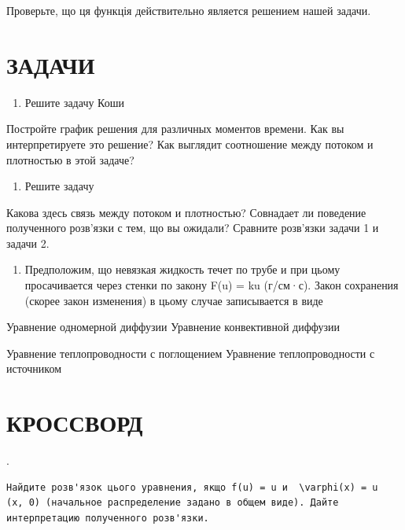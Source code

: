 \documentclass[
  ukrainian,
]{article}
\providecommand{\tightlist}{%
  \setlength{\itemsep}{0pt}\setlength{\parskip}{0pt}}
\begin{document}
Проверьте, що ця функція действительно является решением нашей задачи.

\section{\texorpdfstring{\textbf{ЗАДАЧИ}}{ЗАДАЧИ}}\label{ux437ux430ux434ux430ux447ux438-8}

\begin{enumerate}
\def\labelenumi{\arabic{enumi}.}
\tightlist
\item
  Решите задачу Коши
\end{enumerate}

Постройте график решения для различных моментов времени. Как вы
интерпретируете это решение? Как выглядит соотношение между потоком и
плотностью в этой задаче?

\begin{enumerate}
\def\labelenumi{\arabic{enumi}.}
\setcounter{enumi}{1}
\tightlist
\item
  Решите задачу
\end{enumerate}

Какова здесь связь между потоком и плотностью? Совнадает ли поведение
полученного розв'язки с тем, що вы ожидали? Сравните розв'язки задачи 1
и задачи 2.

\begin{enumerate}
\def\labelenumi{\arabic{enumi}.}
\setcounter{enumi}{2}
\tightlist
\item
  Предположим, що невязкая жидкость течет по трубе и при цьому
  просачивается через стенки по закону F(u) = ku (г/см·с). Закон
  сохранения (скорее закон изменения) в цьому случае записывается в виде
\end{enumerate}

Уравнение одномерной диффузии Уравнение конвективной диффузии

Уравнение теплопроводности с поглощением Уравнение теплопроводности с
источником

\section{\texorpdfstring{\textbf{КРОССВОРД}}{КРОССВОРД}}\label{ux43aux440ux43eux441ux441ux432ux43eux440ux434}

.

\begin{verbatim}
Найдите розв'язок цього уравнения, якщо f(u) = u и  \varphi(x) = u  (x, 0) (начальное распределение задано в общем виде). Дайте интерпретацию полученного розв'язки.
\end{verbatim}
\end{document}
